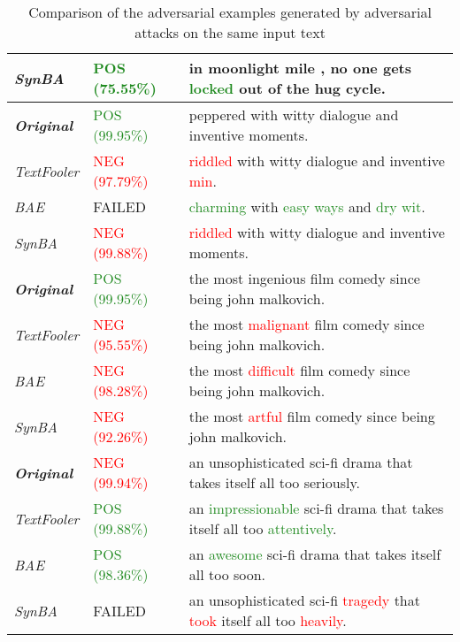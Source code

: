 \begin{table}[h]
\begin{tabularx}{\textwidth}{|l||l|X|}
      \emph{SynBA} & \textcolor{ForestGreen}{POS (75.55\%)} & in moonlight mile , no one gets \textcolor{ForestGreen}{locked} out of the hug cycle.\\
      \hline
      \textbf{\emph{Original}} & \textcolor{ForestGreen}{POS (99.95\%)} & peppered with witty dialogue and inventive moments.\\
      \emph{TextFooler} & \textcolor{red}{NEG (97.79\%)} & \textcolor{red}{riddled} with witty dialogue and inventive \textcolor{red}{min}.\\
      \emph{BAE} & FAILED & \textcolor{ForestGreen}{charming} with \textcolor{ForestGreen}{easy ways} and \textcolor{ForestGreen}{dry wit}.\\
      \emph{SynBA} & \textcolor{red}{NEG (99.88\%)} & \textcolor{red}{riddled} with witty dialogue and inventive moments.\\
      \hline
      \textbf{\emph{Original}} & \textcolor{ForestGreen}{POS (99.95\%)} & the most ingenious film comedy since being john malkovich.\\
      \emph{TextFooler} & \textcolor{red}{NEG (95.55\%)} & the most \textcolor{red}{malignant} film comedy since being john malkovich.\\
      \emph{BAE} & \textcolor{red}{NEG (98.28\%)} & the most \textcolor{red}{difficult} film comedy since being john malkovich.\\
      \emph{SynBA} & \textcolor{red}{NEG (92.26\%)} & the most \textcolor{red}{artful} film comedy since being john malkovich.\\
      \hline
      \textbf{\emph{Original}} & \textcolor{red}{NEG (99.94\%)} & an unsophisticated sci-fi drama that takes itself all too seriously. \\
      \emph{TextFooler} & \textcolor{ForestGreen}{POS (99.88\%)} & an \textcolor{ForestGreen}{impressionable} sci-fi drama that takes itself all too \textcolor{ForestGreen}{attentively}.\\
      \emph{BAE} & \textcolor{ForestGreen}{POS (98.36\%)} & an \textcolor{ForestGreen}{awesome} sci-fi drama that takes itself all too soon.\\
      \emph{SynBA} & FAILED & an unsophisticated sci-fi \textcolor{red}{tragedy} that \textcolor{red}{took} itself all too \textcolor{red}{heavily}.\\
      \hline
    \end{tabularx}
    \caption{Comparison of the adversarial examples generated by adversarial attacks on the same input text}
  \label{tab:adversarial_examples_generated}
\end{table}




